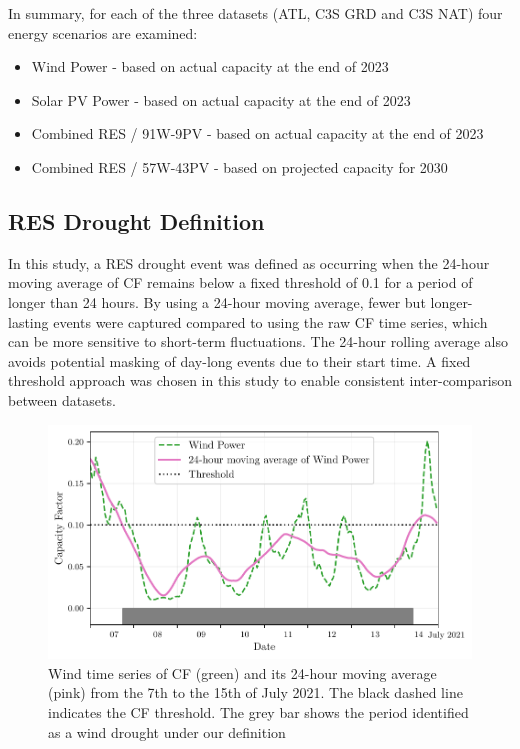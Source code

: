\documentclass[preprint, 12pt]{elsarticle}
\begin{document}
In summary, for each of the three datasets (ATL, C3S GRD and C3S NAT) four energy scenarios are examined:

\begin{itemize}
	\item Wind Power - based on actual capacity at the end of 2023
	\item Solar PV Power - based on actual capacity at the end of 2023
	\item Combined RES / 91W-9PV - based on actual capacity at the end of 2023
	\item Combined RES / 57W-43PV - based on projected capacity for 2030
\end{itemize}

\subsection{RES Drought Definition}
\label{sec:res_drought}

In this study, a RES drought event was defined as occurring when the 24-hour moving average of CF remains below a fixed threshold of 0.1 for a period of longer than 24 hours. By using a 24-hour moving average, fewer but longer-lasting events were captured compared to using the raw CF time series, which can be more sensitive to short-term fluctuations. The 24-hour rolling average also avoids potential masking of day-long events due to their start time. A fixed threshold approach was chosen in this study to enable consistent inter-comparison between datasets.

\begin{figure}[ht!]
	\centering
	\includegraphics[width=\textwidth]{droughts_methodology.pdf}
	\caption{Wind time series of CF (green) and its 24-hour moving average (pink) from the 7th to the 15th of July 2021. The black dashed line indicates the CF threshold. The grey bar shows the period identified as a wind drought under our definition}
	\label{fig:find_res_droughts}
\end{figure}
\end{document}
